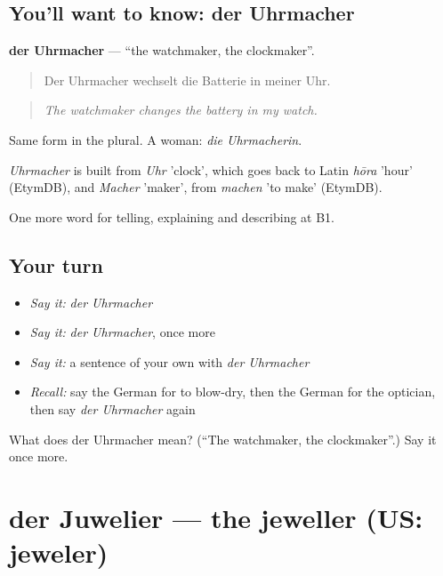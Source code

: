 \subsection*{You'll want to know: der Uhrmacher}
\textbf{der Uhrmacher} — \textquotedblleft{}the watchmaker, the clockmaker\textquotedblright{}.

\begin{quote}
Der Uhrmacher wechselt die Batterie in meiner Uhr.
\end{quote}

\begin{quote}
\emph{The watchmaker changes the battery in my watch.}
\end{quote}

Same form in the plural. A woman: \emph{die Uhrmacherin}.

\begin{cousinweb}
\emph{Uhrmacher} is built from \emph{Uhr} 'clock', which goes back to Latin \emph{hōra} 'hour' (EtymDB), and \emph{Macher} 'maker', from \emph{machen} 'to make' (EtymDB).
\end{cousinweb}

\begin{grammarlens}[title={What you've built}]
One more word for telling, explaining and describing at B1.
\end{grammarlens}

\subsection*{Your turn}
\begin{itemize}
\raggedright
  \item \emph{Say it:} \emph{der Uhrmacher}
  \item \emph{Say it:} \emph{der Uhrmacher}, once more
  \item \emph{Say it:} a sentence of your own with \emph{der Uhrmacher}
  \item \emph{Recall:} say the German for to blow-dry, then the German for the optician, then say \emph{der Uhrmacher} again
\end{itemize}

\begin{tcolorbox}[breakable,colback=teal!4,colframe=teal!35!black,title={Before you move on}]
What does der Uhrmacher mean? (\textquotedblleft{}The watchmaker, the clockmaker\textquotedblright{}.) Say it once more.
\end{tcolorbox}
\section[der Juwelier]{der Juwelier — the jeweller (US: jeweler)}

